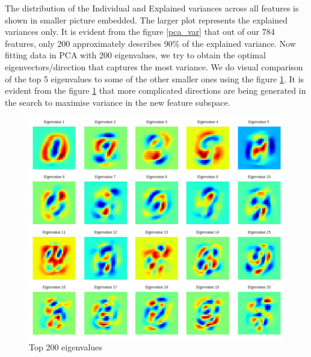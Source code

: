The distribution of the Individual and Explained variances across all features  is shown in smaller picture embedded. The larger plot represents the explained variances only. It is evident from the figure \ref{pca_var} that out of our 784 features, only 200 approximately describes 90\% of the explained variance. Now fitting data in PCA with 200 eigenvalues, we try to obtain the optimal eigenvectors/direction that captures the most variance. We do visual comparison of the top 5 eigenvalues to some of the other smaller ones using the figure \ref{pca_vis}. It is evident from the figure \ref{pca_vis} that more complicated directions are being generated in the search to maximise variance in the new feature subspace.

\begin{figure}[h!]
\begin{center}
\includegraphics[width=\textwidth]{./Figures/pca_vis.png}
\caption {Top 200 eigenvalues}
\label{pca_vis} 
\end{center}
\end{figure}

